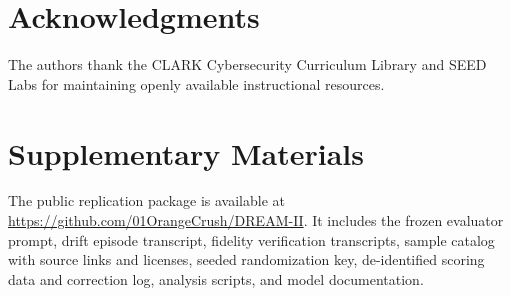 \documentclass[sigconf]{acmart}
\newif\ifanonymousreview
\begin{document}
\ifanonymousreview
\else
\section*{Acknowledgments}
The authors thank the CLARK Cybersecurity Curriculum Library and SEED Labs for maintaining openly available instructional resources.
\fi

\section*{Supplementary Materials}
The public replication package is available at \url{https://github.com/01OrangeCrush/DREAM-II}. It includes the frozen evaluator prompt, drift episode transcript, fidelity verification transcripts, sample catalog with source links and licenses, seeded randomization key, de-identified scoring data and correction log, analysis scripts, and model documentation.
\end{document}
